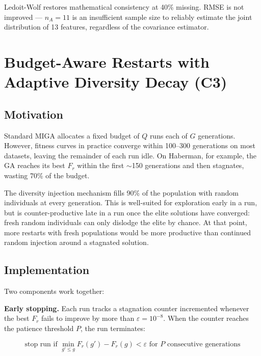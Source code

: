 Ledoit-Wolf restores mathematical consistency at 40\% missing. RMSE is not improved --- $n_A = 11$ is an insufficient sample size to reliably estimate the joint distribution of 13 features, regardless of the covariance estimator.


\section{Budget-Aware Restarts with Adaptive Diversity Decay (C3)}
\label{sec:budget_aware}

\subsection{Motivation}

Standard MIGA allocates a fixed budget of $Q$ runs each of $G$ generations. However, fitness curves in practice converge within 100--300 generations on most datasets, leaving the remainder of each run idle. On Haberman, for example, the GA reaches its best $F_r$ within the first $\sim$150 generations and then stagnates, wasting 70\% of the budget.

The diversity injection mechanism fills 90\% of the population with random individuals at every generation. This is well-suited for exploration early in a run, but is counter-productive late in a run once the elite solutions have converged: fresh random individuals can only dislodge the elite by chance. At that point, more restarts with fresh populations would be more productive than continued random injection around a stagnated solution.

\subsection{Implementation}

Two components work together:

\textbf{Early stopping.} Each run tracks a stagnation counter incremented whenever the best $F_r$ fails to improve by more than $\varepsilon = 10^{-8}$. When the counter reaches the patience threshold $P$, the run terminates:

\begin{equation}
    \text{stop run if } \min_{g' \leq g} F_r(g') - F_r(g) < \varepsilon \text{ for } P \text{ consecutive generations}
\end{equation}


